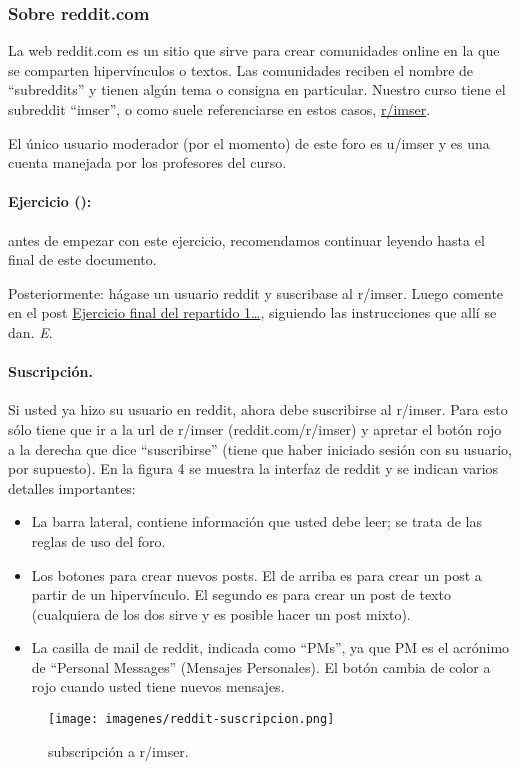 \documentclass[]{article}
\makeatletter
\def\maxwidth{\ifdim\Gin@nat@width>\linewidth\linewidth
\else\Gin@nat@width\fi}
\let\Oldincludegraphics\includegraphics
\renewcommand{\includegraphics}[1]{\Oldincludegraphics[width=\maxwidth]{#1}}
\makeatother
\begin{document}
\subsubsection{Sobre reddit.com}

La web reddit.com es un sitio que sirve para crear comunidades online en
la que se comparten hipervínculos o textos. Las comunidades reciben el
nombre de ``subreddits'' y tienen algún tema o consigna en particular.
Nuestro curso tiene el subreddit ``imser'', o como suele referenciarse
en estos casos, \href{reddit.com/r/imser}{r/imser}.

El único usuario moderador (por el momento) de este foro es u/imser y es
una cuenta manejada por los profesores del curso.

\paragraph{Ejercicio ():}

antes de empezar con este ejercicio, recomendamos continuar leyendo
hasta el final de este documento.

Posteriormente: hágase un usuario reddit y suscribase al r/imser. Luego
comente en el post
\href{http://www.reddit.com/r/imser/comments/1la8s8/ejercicio\_final\_del\_repartido\_1\_suscribirse\_a/}{Ejercicio
final del repartido 1\ldots{}}, siguiendo las instrucciones que allí se
dan. \emph{E}.

\paragraph{Suscripción.}

Si usted ya hizo su usuario en reddit, ahora debe suscribirse al
r/imser. Para esto sólo tiene que ir a la url de r/imser
(reddit.com/r/imser) y apretar el botón rojo a la derecha que dice
``suscribirse'' (tiene que haber iniciado sesión con su usuario, por
supuesto). En la figura 4 se muestra la interfaz de reddit y se indican
varios detalles importantes:

\begin{itemize}
\item
  La barra lateral, contiene información que usted debe leer; se trata
  de las reglas de uso del foro.
\item
  Los botones para crear nuevos posts. El de arriba es para crear un
  post a partir de un hipervínculo. El segundo es para crear un post de
  texto (cualquiera de los dos sirve y es posible hacer un post mixto).
\item
  La casilla de mail de reddit, indicada como ``PMs'', ya que PM es el
  acrónimo de ``Personal Messages'' (Mensajes Personales). El botón
  cambia de color a rojo cuando usted tiene nuevos mensajes.
\end{itemize}
\begin{figure}[htbp]
\centering
\texttt{[image: imagenes/reddit-suscripcion.png]}
\caption{subscripción a r/imser.}
\end{figure}
\end{document}
